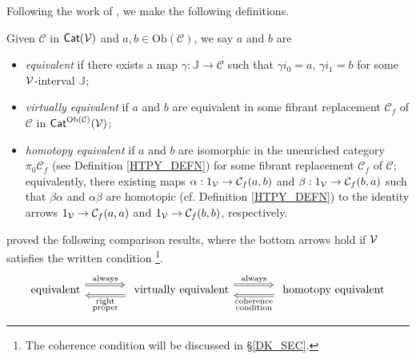 \documentclass[a4paper,10pt
,draft
]{article}%
\newcommand{\J}{\mathbb J}
\renewcommand{\1}{\eta}%
\begin{document}
Following the work of \cite{Cav, BM13}, we make the following definitions.

\begin{definition}
      \label{EQUIV_DEF}
      Given $\mathcal{C}$ in  $\mathsf{Cat}(\mathcal V)$ and $a,b\in\mathrm{Ob}(\mathcal C)$, we say $a$ and $b$ are
      \begin{itemize}
      \item {\em equivalent} if there exists a map $\gamma: \J \to \mathcal C$ such that
            $\gamma i_0 = a$, $\gamma i_1 = b$
            for some $\mathcal V$-interval $\J$;
      \item {\em virtually equivalent} if $a$ and $b$ are equivalent in some fibrant replacement
            $\mathcal C_f$ of $\mathcal C$ in $\mathsf{Cat}^{\mathrm{Ob}(\mathcal C)}(\mathcal V)$;
      \item {\em homotopy equivalent} if $a$ and $b$ are isomorphic in the unenriched category $\pi_0 \mathcal C_f$ (see Definition \ref{HTPY_DEFN})
            for some fibrant replacement $\mathcal C_f$ of $\mathcal C$;
            equivalently,
            there existing maps
            $\alpha: 1_{\mathcal V} \to \mathcal C_f(a,b)$ and $\beta: 1_{\mathcal V}\to \mathcal C_f(b,a)$ such that
            $\beta\alpha$ and $\alpha\beta$ are homotopic (cf. Definition \ref{HTPY_DEFN})
            to the identity arrows
            $1_{\mathcal V} \to \mathcal C_f(a,a)$ and $1_{\mathcal V} \to \mathcal C_f(b,b)$, respectively.
      \end{itemize}
\end{definition}

\cite{Cav, BM13} proved the following comparison results,
where the bottom arrows hold if $\mathcal V$ satisfies the written condition \footnote{The coherence condition will be discussed in \S \ref{DK_SEC}.}.
\[
      \begin{tikzcd}[column sep = large]
            \mbox{equivalent}
            \arrow[r, Rightarrow, shift left=2, "\mathrm{always}"]
            &
            \mbox{ virtually equivalent}
            \arrow[r, Rightarrow, shift left=2, "\mathrm{always}"]
            \arrow[l, Rightarrow, shift left = 2, "\substack{\mathrm{right} \\ \mathrm{proper}}"]
            &
            \mbox{ homotopy equivalent}
            \arrow[l, Rightarrow, shift left = 2, "\substack{\mathrm{coherence} \\ \mathrm{condition}}"]
      \end{tikzcd}
\]
\end{document}
